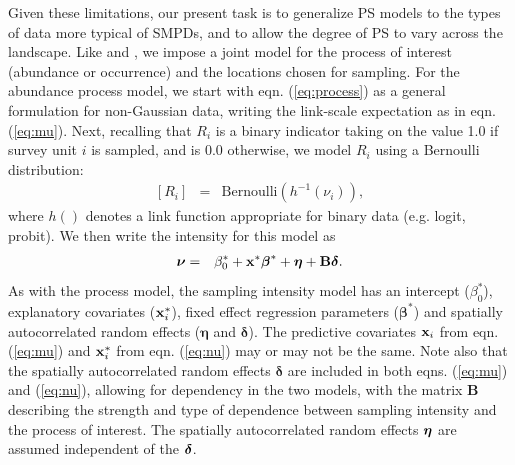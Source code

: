 \documentclass[times,mee,doublespace,]{besauth2}
\begin{document}
Given these limitations, our present task is to generalize PS models to the types of data more typical of SMPDs, and to allow the degree of PS to vary across the landscape.  Like \citet{DiggleEtAl2010} and \citet{PatiEtAl2011}, we impose a joint model for the process of interest (abundance or occurrence) and the locations chosen for sampling. For the abundance process model, we start with eqn. (\ref{eq:process}) as a general formulation for non-Gaussian data, writing the link-scale expectation as in eqn. (\ref{eq:mu}).
Next, recalling that $R_i$ is a binary indicator taking on the value 1.0 if survey unit $i$ is sampled, and is 0.0 otherwise, we model $R_i$ using a Bernoulli distribution:
\begin{eqnarray}
 \label{eq:R}
  [R_i] & = & \text{Bernoulli}(h^{-1}(\nu_i)),
\end{eqnarray}
where $h()$ denotes a link function appropriate for binary data (e.g. logit, probit).  We then write the intensity for this model as
\begin{eqnarray}
  \label{eq:nu}
  \boldsymbol{\nu} & = & \beta_0^* + {\bf x}^* \boldsymbol{\beta}^*+\boldsymbol{\eta}+{\bf B} \boldsymbol{\delta}.
\label{eq:nu}
\end{eqnarray}
  As with the process model, the sampling intensity model has an intercept ($\beta_0^*$), explanatory covariates (${\bf x}_i^*$), fixed effect regression parameters ($\boldsymbol{\beta}^*$) and spatially autocorrelated random effects ($\boldsymbol{\eta}$ and $\boldsymbol{\delta}$).  The predictive covariates ${\bf x}_i$ from eqn. (\ref{eq:mu}) and ${\bf x}_i^*$ from eqn. (\ref{eq:nu}) may or may not be the same.  Note also that the  spatially autocorrelated random effects $\boldsymbol{\delta}$ are included in both eqns. (\ref{eq:mu}) and (\ref{eq:nu}), allowing for dependency in the two models, with the matrix {\bf B} describing the strength and type of dependence between sampling intensity and the process of interest.  The spatially autocorrelated random effects $\boldsymbol{\eta}$ are assumed independent of the $\boldsymbol{\delta}$.
\end{document}
